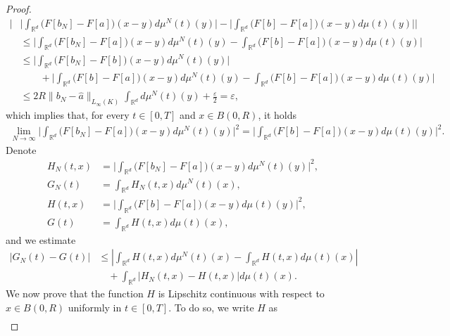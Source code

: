 \documentclass[A4paper,11pt]{article}
\theoremstyle{definition}
\newcommand{\R}{\mathbb{R}}
\begin{document}
\begin{proof}
	\begin{align*}
		\Biggl|
			&\biggl|\int_{\R^d}\bigl(F[ b_{N}]-F[a]\bigr)(x-y)d\mu^{N}(t)(y)\biggr|
				-\biggl|\int_{\R^d}\bigl(F[ b]-F[a]\bigr)(x-y)d\mu(t)(y)\biggr|\Biggr|\\
			&\leq\biggl|\int_{\R^d}\bigl(F[ b_{N}]-F[a]\bigr)(x-y)d\mu^{N}(t)(y)
					-\int_{\R^d}\bigl(F[ b]-F[a]\bigr)(x-y)d\mu(t)(y)\biggr|\\
			&\leq\Biggl|\int_{\R^d}
				\bigl(F[ b_{N}]-F[ b]\bigr)(x-y)d\mu^{N}(t)(y)\Biggr|\\
			&\qquad +\biggl|\int_{\R^d}\bigl(F[ b]-F[a]\bigr)(x-y)d\mu^{N}(t)(y)
					-\int_{\R^d}\bigl(F[ b]-F[a]\bigr)(x-y)d\mu(t)(y)\biggr|\\
			&\leq2R \| b_{N}-\widehat  a\|_{L_\infty(K)}\int_{\R^d}d\mu^{N}(t)(y)+\frac{\varepsilon}{2}=\varepsilon,
	\end{align*}
	which implies that, for every $t \in [0,T]$ and $x \in B(0,R)$, it holds
	\begin{align}\label{firstlim}
		\lim_{N\rightarrow\infty}\Biggl|\int_{\R^d}\bigl(F[ b_{N}]-F[a]\bigr)(x-y)d\mu^{N}(t)(y)\Biggr|^2
			=\Biggl|\int_{\R^d}\bigl(F[ b]-F[a]\bigr)(x-y)d\mu(t)(y)\Biggr|^2.
	\end{align}
	Denote
	\begin{align*}
		H_N(t,x)&=\Biggl|\int_{\R^d}\bigl(F[ b_{N}]-F[a]\bigr)(x-y)d\mu^{N}(t)(y)\Biggr|^2,\\
		G_N(t)&= \int_{\R^d}H_N(t,x)d\mu^N(t)(x),\\
		H(t,x)&= \Biggl|\int_{\R^d}\bigl(F[ b]-F[a]\bigr)(x-y)d\mu(t)(y)\Biggr|^2,\\
		G(t)&= \int_{\R^d}H(t,x)d\mu(t)(x),
	\end{align*}
	and we estimate
	\begin{align}
		|G_N(t)-G(t)|&\leq \left|\int_{\R^d}H(t,x)d\mu^N(t)(x) - \int_{\R^d}H(t,x)d\mu(t)(x)\right| \nonumber\\
		&\quad + \int_{\R^d}\left|H_N(t,x) - H(t,x)\right|d\mu(t)(x). \label{pippo3}
	\end{align}
	We now prove that the function $H$ is Lipschitz continuous with respect to $x \in B(0,R)$ uniformly in $t \in [0,T]$. To do so, we write $H$ as
	\begin{align*}

\end{align*}
\end{proof}
\end{document}
